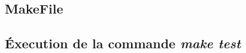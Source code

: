 \documentclass[11pt]{article}
\begin{document}
\begin{centering}
\end{centering}


\subsection{MakeFile} \label{subsec: make}
\begin{centering}
\end{centering}

\subsection{\'Execution de la commande \emph{make test}} \label{subsec: maketest}
\end{document}
